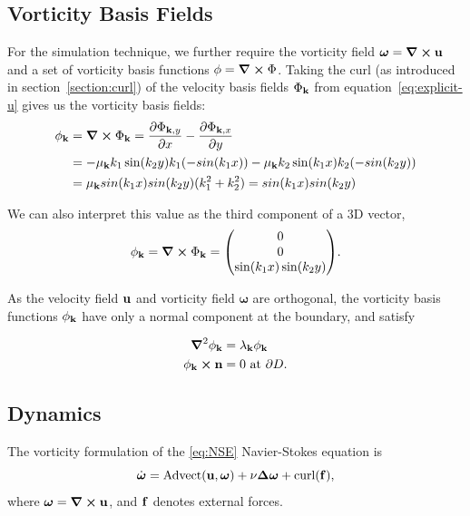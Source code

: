 \subsection*{Vorticity Basis Fields}
For the simulation technique, we further require the vorticity field
$\boldsymbol\omega = \curl{\vb{u}}$ and a set of vorticity basis functions $\phi
= \curl{\Phi}$.  Taking the curl (as introduced in section~\ref{section:curl})
of the velocity basis fields $\Phi_{\vb{k}}$ from equation~\eqref{eq:explicit-u}
gives us the vorticity basis fields:
\begin{align*}
    \phi_{\vb{k}} &= \curl{\Phi_{\vb{k}}} 
    =  \pdv{\Phi_{\vb{k},y}}{x} - \pdv{\Phi_{\vb{k},x}}{y}\\
&= -\mu_{\vb{k}} k_1 \sin(k_2 y) k_1(-sin(k_1 x)) - \mu_{\vb{k}} k_2 \sin(k_1 x)
    k_2 (-sin(k_2 y))\\
&= \mu_{\vb{k}} sin(k_1 x) sin(k_2 y)(k_1^2+k_2^2) = sin(k_1 x) sin(k_2 y)
\end{align*}

We can also interpret this value as the third component of a 3D vector,
\begin{equation}
\label{eq:vorticity-basis}
\phi_{\vb{k}} = \curl{\Phi_{\vb{k}}} 
= \mqty(0 \\ 0 \\ \sin(k_1 x) \sin(k_2 y)).
\end{equation}

As the velocity field $\vb{u}$ and vorticity field $\boldsymbol{\omega}$ are
orthogonal, the vorticity basis functions $\phi_{\vb{k}}$ have only a normal
component at the boundary, and satisfy

\begin{align}
    \grad^2{\phi_{\vb{k}}} &= \lambda_{\vb{k}}\phi_{\vb{k}}\\
    \phi_{\vb{k}} \cross \vb{n} &= 0 \text{ at } \partial D.
\end{align}

\subsection*{Dynamics}
The vorticity formulation of the \eqref{eq:NSE} Navier-Stokes equation is
\begin{equation}
    \dot{\boldsymbol{\omega}} = \text{Advect}(\bf{u}, \boldsymbol{\omega}) + \nu
    \Delta\boldsymbol{\omega}
    + \text{curl}(\bf{f}),
\label{eq:NSE-vorticity}
\end{equation}
where $\boldsymbol{\omega} = \curl{\bf{u}}$, and $\bf{f}$ denotes external
forces.

